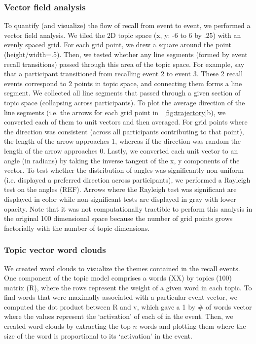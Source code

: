 \documentclass{article}
\begin{document}
{\subsubsection{Vector field analysis}
To quantify (and visualize) the flow of recall from event to event, we performed a vector field analysis.  We tiled the 2D topic space (x, y: -6 to 6 by .25) with an evenly spaced grid. For each grid point, we drew a square around the point (height/width=.5). Then, we tested whether any line segments (formed by event recall transitions) passed through this area of the topic space.  For example, say that a participant transitioned from recalling event 2 to event 3. These 2 recall events correspond to 2 points in topic space, and connecting them forms a line segment. We collected all line segments that passed through a given section of topic space (collapsing across participants). To plot the average direction of the line segments (i.e. the arrows for each grid point in ~\ref{fig:trajectory}b), we converted each of them to unit vectors and then averaged. For grid points where the direction was consistent (across all participants contributing to that point), the length of the arrow approaches 1, whereas if the direction was random the length of the arrow approaches 0. Lastly, we converted each unit vector to an angle (in radians) by taking the inverse tangent of the x, y components of the vector. To test whether the distribution of angles was significantly non-uniform (i.e. displayed a preferred direction across participants), we performed a Rayleigh test on the angles (REF). Arrows where the Rayleigh test was significant are displayed in color while non-significant tests are displayed in gray with lower opacity. Note that it was not computationally tractible to perform this analysis in the original 100 dimensional space because the number of grid points grows factorially with the number of topic dimensions.

\subsubsection{Topic vector word clouds}
 We created word clouds to visualize the themes contained in the recall events. One component of the topic model comprises a words (XX) by topics (100) matrix (R), where the rows represent the weight of a given word in each topic.  To find words that were maximally associated with a particular event vector, we computed the dot product between R and v, which gave a 1 by \# of words vector where the values represent the `activation' of each of in the event. Then, we created word clouds by extracting the top $n$ words and plotting them where the size of the word is proportional to its `activation' in the event.

}
\end{document}
